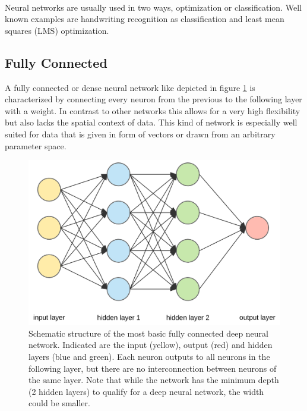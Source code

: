 		~\\
		Neural networks are usually used in two ways, optimization or classification. Well known examples are handwriting recognition as classification and least mean squares (LMS) optimization.
		\subsection{Fully Connected}
			\label{NNExample}
			A fully connected or dense neural network like depicted in figure \ref{Img_NNFully} is characterized by connecting every neuron from the previous to the following layer with a weight. In contrast to other networks this allows for a very high flexibility but also lacks the spatial context of data. This kind of network is especially well suited for data that is given in form of vectors or drawn from an arbitrary parameter space.%
			
			\begin{figure}
				\includegraphics[width=\textwidth]{images/simpleNN.png}
				\caption{Schematic structure of the most basic fully connected deep neural network. Indicated are the input (yellow), output (red) and hidden layers (blue and green). Each neuron outputs to all neurons in the following layer, but there are no interconnection between neurons of the same layer. Note that while the network has the minimum depth (2 hidden layers) to qualify for a deep neural network, the width  could be smaller.}
				\label{Img_NNFully}
			\end{figure}

